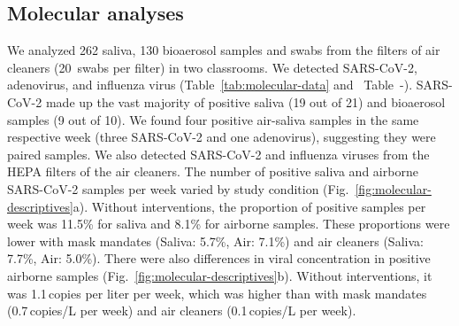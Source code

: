 \documentclass[fleqn,11pt]{wlscirep}
\begin{document}
\subsection{Molecular analyses}

We analyzed 262 saliva, 130 bioaerosol samples and swabs from the filters of air cleaners (20~swabs per filter) in two classrooms. We detected SARS-CoV-2, adenovirus, and influenza virus (Table~\ref{tab:molecular-data} and \supp~Table~-). SARS-CoV-2 made up the vast majority of positive saliva (19 out of 21) and bioaerosol samples (9 out of 10). We found four positive air-saliva samples in the same respective week (three SARS-CoV-2 and one adenovirus), suggesting they were paired samples. We also detected SARS-CoV-2 and influenza viruses from the HEPA filters of the air cleaners. The number of positive saliva and airborne SARS-CoV-2 samples per week varied by study condition (Fig.~\ref{fig:molecular-descriptives}a). Without interventions, the proportion of positive samples per week was 11.5\% for saliva and 8.1\% for airborne samples. These proportions were lower with mask mandates (Saliva: 5.7\%, Air: 7.1\%) and air cleaners (Saliva: 7.7\%, Air: 5.0\%). There were also differences in viral concentration in positive airborne samples (Fig.~\ref{fig:molecular-descriptives}b). Without interventions, it was 1.1\,copies per liter per week, which was higher than with mask mandates (0.7\,copies/L per week) and air cleaners (0.1\,copies/L per week). 
\end{document}
